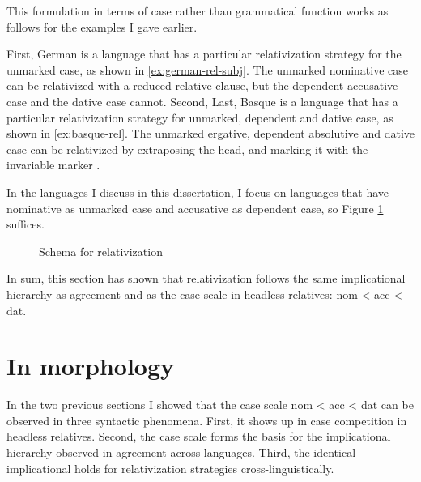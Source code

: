This formulation in terms of case rather than grammatical function works as follows for the examples I gave earlier.

First, German is a language that has a particular relativization strategy for the unmarked case, as shown in \ref{ex:german-rel-subj}. The unmarked nominative case can be relativized with a reduced relative clause, but the dependent accusative case and the dative case cannot.
Second,
Last, Basque is a language that has a particular relativization strategy for unmarked, dependent and dative case, as shown in \ref{ex:basque-rel}. The unmarked ergative, dependent absolutive and dative case can be relativized by extraposing the head, and marking it with the invariable marker .

In the languages I discuss in this dissertation, I focus on languages that have nominative as unmarked case and accusative as dependent case, so Figure \ref{fig:rel-nom-acc-dat} suffices.

\begin{figure}[ht]
  \centering
  \caption{Schema for relativization}
  \label{fig:rel-nom-acc-dat}
\end{figure}

In sum, this section has shown that relativization follows the same implicational hierarchy as agreement and as the case scale in headless relatives: \ac{nom} < \ac{acc} < \ac{dat}.


\section{In morphology}\label{sec:case-morphology}

In the two previous sections I showed that the case scale \ac{nom} < \ac{acc} < \ac{dat} can be observed in three syntactic phenomena. First, it shows up in case competition in headless relatives. Second, the case scale forms the basis for the implicational hierarchy observed in agreement across languages. Third, the identical implicational holds for relativization strategies cross-linguistically.

